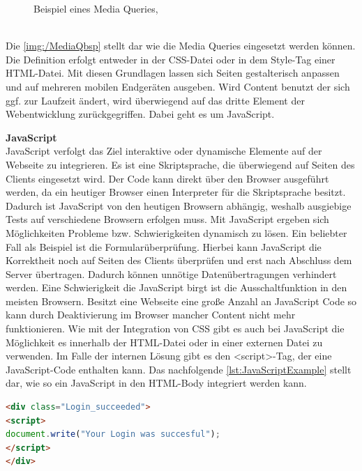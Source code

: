\documentclass[a4paper,titlepage,halfparskip,12pt]{scrreprt}
\begin{document}
\begin{onehalfspacing}
\begin{figure}[h]
	\caption{Beispiel eines Media Queries, \cite{buhler2017html5}}
	\label{img:/MediaQbsp}
\end{figure}
\\Die \autoref{img:/MediaQbsp} stellt dar wie die Media Queries eingesetzt werden können. Die Definition erfolgt entweder in der \ac{CSS}-Datei oder in dem Style-Tag einer \ac{HTML}-Datei. Mit diesen Grundlagen lassen sich Seiten gestalterisch anpassen und auf mehreren mobilen Endgeräten ausgeben. Wird Content benutzt der sich ggf. zur Laufzeit ändert, wird überwiegend auf das dritte Element der Webentwicklung zurückgegriffen. Dabei geht es um JavaScript.\cite{buhler2017html5}

\textbf{JavaScript}\\
JavaScript verfolgt das Ziel interaktive oder dynamische Elemente auf der Webseite zu integrieren. Es ist eine Skriptsprache, die überwiegend auf Seiten des Clients eingesetzt wird. Der Code kann direkt über den Browser ausgeführt werden, da ein heutiger Browser einen Interpreter für die Skriptsprache besitzt. Dadurch ist JavaScript von den heutigen Browsern abhängig, weshalb ausgiebige Tests auf verschiedene Browsern erfolgen muss. Mit JavaScript ergeben sich Möglichkeiten Probleme bzw. Schwierigkeiten dynamisch zu lösen. Ein beliebter Fall als Beispiel ist die Formularüberprüfung. Hierbei kann JavaScript die Korrektheit noch auf Seiten des Clients überprüfen und erst nach Abschluss dem Server übertragen. Dadurch können unnötige Datenübertragungen verhindert werden. Eine Schwierigkeit die JavaScript birgt ist die Ausschaltfunktion in den meisten Browsern. Besitzt eine Webseite eine große Anzahl an JavaScript Code so kann durch Deaktivierung im Browser mancher Content nicht mehr funktionieren. Wie mit der Integration von \ac{CSS} gibt es auch bei JavaScript die Möglichkeit es innerhalb der \ac{HTML}-Datei oder in einer externen Datei zu verwenden. Im Falle der internen Lösung gibt es den <script>-Tag, der eine JavaScript-Code enthalten kann. Das nachfolgende \autoref{lst:JavaScriptExample} stellt dar, wie so ein JavaScript in den HTML-Body integriert werden kann.
\begin{lstlisting}[language=HTML,caption=Example Listing of JavaScript-Code,label={lst:JavaScriptExample}]
<div class="Login_succeeded">
<script>
document.write("Your Login was succesful");
</script>
</div>
\end{lstlisting}

\end{onehalfspacing}
\end{document}
